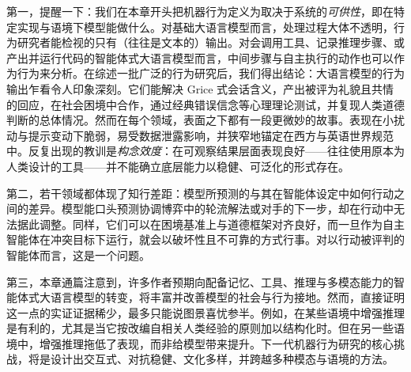 第一，提醒一下：我们在本章开头把机器行为定义为取决于系统的\emph{可供性}，即在特定实现与语境下模型能做什么。对基础大语言模型而言，处理过程大体不透明，行为研究者能检视的只有（往往是文本的）输出。对会调用工具、记录推理步骤、或产出并运行代码的智能体式大语言模型而言，中间步骤与自主执行的动作也可以作为行为来分析。在综述一批广泛的行为研究后，我们得出结论：大语言模型的行为输出乍看令人印象深刻。它们能解决 Grice 式会话含义，产出被评为礼貌且共情的回应，在社会困境中合作，通过经典错误信念等心理理论测试，并复现人类道德判断的总体情况。然而在每个领域，表面之下都有一段更微妙的故事。表现在小扰动与提示变动下脆弱，易受数据泄露影响，并狭窄地锚定在西方与英语世界规范中。反复出现的教训是\emph{构念效度}：在可观察结果层面表现良好——往往使用原本为人类设计的工具——并不能确立底层能力以稳健、可泛化的形式存在。

第二，若干领域都体现了知行差距：模型所预测的与其在智能体设定中如何行动之间的差异。模型能口头预测协调博弈中的轮流解法或对手的下一步，却在行动中无法据此调整。同样，它们可以在困境基准上与道德框架对齐良好，而一旦作为自主智能体在冲突目标下运行，就会以破坏性且不可靠的方式行事。对以行动被评判的智能体而言，这是一个问题。

第三，本章通篇注意到，许多作者预期向配备记忆、工具、推理与多模态能力的智能体式大语言模型的转变，将丰富并改善模型的社会与行为接地。然而，直接证明这一点的实证证据稀少，最多只能说图景喜忧参半。例如，在某些语境中增强推理是有利的，尤其是当它按改编自相关人类经验的原则加以结构化时。但在另一些语境中，增强推理拖低了表现，而非给模型带来提升。下一代机器行为研究的核心挑战，将是设计出交互式、对抗稳健、文化多样，并跨越多种模态与语境的方法。




